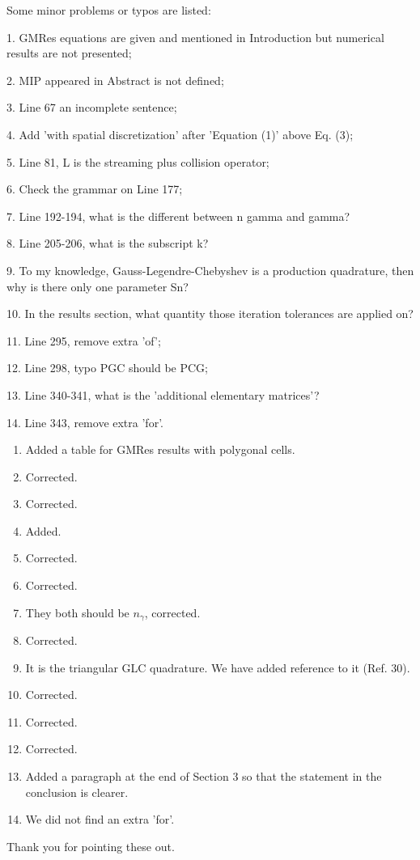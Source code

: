 \documentclass{article}
\begin{document}
{
\color{blue}
\noindent
Some minor problems or typos are listed:

1. GMRes equations are given and mentioned in Introduction but numerical results are not presented;

2. MIP appeared in Abstract is not defined;

3. Line 67 an incomplete sentence;

4. Add 'with spatial discretization' after 'Equation (1)' above Eq. (3);

5. Line 81, L is the streaming plus collision operator;

6. Check the grammar on Line 177;

7. Line 192-194, what is the different between n gamma and gamma?

8. Line 205-206, what is the subscript k?

9. To my knowledge, Gauss-Legendre-Chebyshev is a production quadrature, then why is there only one parameter Sn?

10. In the results section, what quantity those iteration tolerances are applied on?

11. Line 295, remove extra 'of';

12. Line 298, typo PGC should be PCG;

13. Line 340-341, what is the 'additional elementary matrices'?

14. Line 343, remove extra 'for'.}



\begin{enumerate}
\item Added a table for GMRes results with polygonal cells.
\item Corrected.
\item Corrected.
\item Added.
\item Corrected.
\item Corrected.
\item They both should be $n_\gamma$, corrected.
\item Corrected.
\item It is the triangular GLC quadrature. We have added reference to it (Ref. 30).
\item Corrected.
\item Corrected.
\item Corrected.
\item Added a paragraph at the end of Section 3 so that the statement in the conclusion is clearer.
\item We did not find an extra 'for'.
\end{enumerate}

\noindent 
Thank you for pointing these out.
\end{document}
